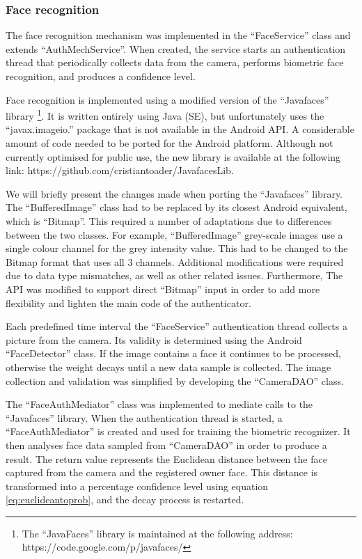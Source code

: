 \subsubsection{Face recognition}
\label{implface}
The face recognition mechanism was implemented in the ``FaceService'' class and extends ``AuthMechService''. When created, the service starts an authentication thread that periodically collects data from the camera, performs biometric face recognition, and produces a confidence level.

Face recognition is implemented using a modified version of the ``Javafaces'' library \footnote{The ``JavaFaces'' library is maintained at the following address: https://code.google.com/p/javafaces/}. It is written entirely using Java (SE), but unfortunately uses the ``javax.imageio.'' package that is not available in the Android API. A considerable amount of code needed to be ported for the Android platform. Although not currently optimised for public use, the new library is available at the following link: https://github.com/cristiantoader/JavafacesLib.

We will briefly present the changes made when porting the ``Javafaces'' library. The ``BufferedImage'' class had to be replaced by its closest Android equivalent, which is ``Bitmap''. This required a number of adaptations due to differences between the two classes. For example, ``BufferedImage'' grey-scale images use a single colour channel for the grey intensity value. This had to be changed to the Bitmap format that uses all 3 channels. Additional modifications were required due to data type mismatches, as well as other related issues. Furthermore, The API was modified to support direct ``Bitmap'' input in order to add more flexibility and lighten the main code of the authenticator. 

Each predefined time interval the ``FaceService'' authentication thread collects a picture from the camera. Its validity is determined using the Android ``FaceDetector'' class. If the image contains a face it continues to be processed, otherwise the weight decays until a new data sample is collected. The image collection and validation was simplified by developing the ``CameraDAO'' class.

The ``FaceAuthMediator'' class was implemented to mediate calls to the ``Javafaces'' library. When the authentication thread is started, a ``FaceAuthMediator'' is created and used for training the biometric recognizer. It then analyses face data sampled from ``CameraDAO'' in order to produce a result. The return value represents the Euclidean distance between the face captured from the camera and the registered owner face. This distance is transformed into a percentage confidence level using equation \ref{eq:euclideantoprob}, and the decay process is restarted.  

